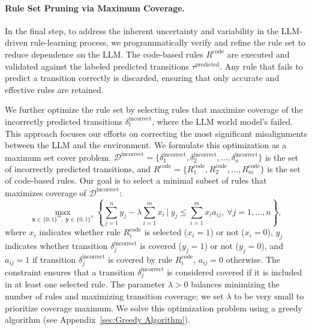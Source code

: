 \documentclass{article} %
\begin{document}
\paragraph{Rule Set Pruning via Maximum Coverage.}
\label{sec:Rule Set Pruning via Maximum Coverage}


In the final step, to address the inherent uncertainty and variability in the LLM-driven rule-learning process, we programmatically verify and refine the rule set to reduce dependence on the LLM. The code-based rules $R^{\text{code}}$ are executed and validated against the labeled predicted transitions $\tau^{\text{predicted}}$. Any rule that fails to predict a transition correctly is discarded, ensuring that only accurate and effective rules are retained.

We further optimize the rule set by selecting rules that maximize coverage of the incorrectly predicted transitions $\delta^{\text{incorrect}}_t$, where the LLM world model's failed. This approach focuses our efforts on correcting the most significant misalignments between the LLM and the environment.
We formulate this optimization as a maximum set cover problem. \( \mathcal{D}^{\text{incorrect}} = \{ \delta^{\text{incorrect}}_1, \delta^{\text{incorrect}}_2, \ldots, \delta^{\text{incorrect}}_n \} \) is the set of incorrectly predicted transitions, and \( R^{\text{code}} = \{ R^{\text{code}}_1, R^{\text{code}}_2, \ldots, R^{\text{code}}_m \} \) is the set of code-based rules. Our goal is to select a minimal subset of rules that maximizes coverage of \( \mathcal{D}^{\text{incorrect}} \):
\begin{equation}
\label{eqn:maximum set cover problem}
    \max_{\bm{x} \in \{0,1\}^{m},\; \bm{y} \in \{0,1\}^{n}} \left\{ \sum_{j=1}^{n} y_j - \lambda \sum_{i=1}^{m} x_i  \ \bigg\vert\ y_j \leq \sum_{i=1}^{m} x_i a_{ij},\ \forall j = 1, \ldots, n \right\},
\end{equation}
where \( x_i \) indicates whether rule \( R^{\text{code}}_i \) is selected (\( x_i = 1 \)) or not (\( x_i = 0 \)), \( y_j \) indicates whether transition \( \delta^{\text{incorrect}}_j \) is covered (\( y_j = 1 \)) or not (\( y_j = 0 \)), and \( a_{ij} = 1 \) if transition \( \delta^{\text{incorrect}}_j \) is covered by rule \( R^{\text{code}}_i \), \( a_{ij} = 0 \) otherwise. 
The constraint ensures that a transition $\delta^{\text{incorrect}}_j$ is considered covered if it is included in at least one selected rule.
The parameter \( \lambda > 0 \) balances minimizing the number of rules and maximizing transition coverage; we set \( \lambda \) to be very small to prioritize coverage maximum. We solve this optimization problem using a greedy algorithm (see Appendix~\ref{sec:Greedy Algorithm}).
\end{document}
